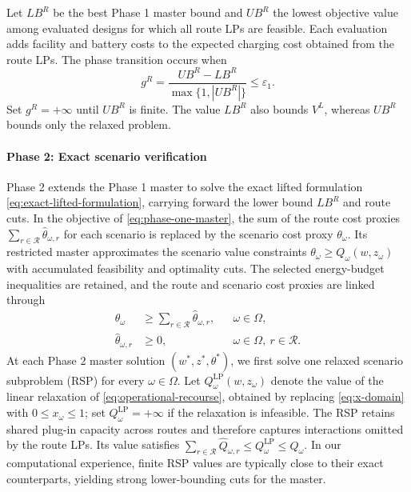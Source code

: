 Let $LB^R$ be the best Phase 1 master bound and $UB^R$ the lowest objective value among evaluated designs for which all route LPs are feasible.
Each evaluation adds facility and battery costs to the expected charging cost obtained from the route LPs.
The phase transition occurs when
\begin{equation}
 g^R=\frac{UB^R-LB^R}{\max\{1,|UB^R|\}}\le\varepsilon_1.
\label{eq:phase-switch}
\end{equation}
Set $g^R=+\infty$ until $UB^R$ is finite.
The value $LB^R$ also bounds $V^L$, whereas $UB^R$ bounds only the relaxed problem.

\paragraph{Phase 2: Exact scenario verification}
Phase 2 extends the Phase 1 master to solve the exact lifted formulation \eqref{eq:exact-lifted-formulation}, carrying forward the lower bound $LB^R$ and route cuts.
In the objective of \eqref{eq:phase-one-master}, the sum of the route cost proxies $\sum_{r\in\mathcal R}\widehat\theta_{\omega,r}$ for each scenario is replaced by the scenario cost proxy $\theta_\omega$.
Its restricted master approximates the scenario value constraints $\theta_\omega\ge Q_\omega(w,z_\omega)$ with accumulated feasibility and optimality cuts.
The selected energy-budget inequalities are retained, and the route and scenario cost proxies are linked through
\begin{equation}
\begin{aligned}
 \theta_\omega&\ge\sum_{r\in\mathcal R}\widehat\theta_{\omega,r}, &&\omega\in\Omega,\\
 \widehat\theta_{\omega,r}&\ge0, &&\omega\in\Omega,\ r\in\mathcal R.
\end{aligned}
\label{eq:phase-two-linking}
\end{equation}
At each Phase 2 master solution $(w^*,z^*,\theta^*)$, we first solve one relaxed scenario subproblem (RSP) for every $\omega\in\Omega$.
Let $Q_\omega^{\mathrm{LP}}(w,z_\omega)$ denote the value of the linear relaxation of \eqref{eq:operational-recourse}, obtained by replacing \eqref{eq:x-domain} with $0\le x_\omega\le1$; set $Q_\omega^{\mathrm{LP}}=+\infty$ if the relaxation is infeasible.
The RSP retains shared plug-in capacity across routes and therefore captures interactions omitted by the route LPs.
Its value satisfies $\sum_{r\in\mathcal R}\widehat Q_{\omega,r}\le Q_\omega^{\mathrm{LP}}\le Q_\omega$.
In our computational experience, finite RSP values are typically close to their exact counterparts, yielding strong lower-bounding cuts for the master.
